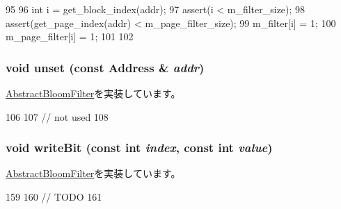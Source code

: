 \begin{DoxyCode}
95 {
96     int i = get_block_index(addr);
97     assert(i < m_filter_size);
98     assert(get_page_index(addr) < m_page_filter_size);
99     m_filter[i] = 1;
100     m_page_filter[i] = 1;
101 
102 }
\end{DoxyCode}
\hypertarget{classMultiGrainBloomFilter_a69b772787ea61467af679e3aa5406b41}{
\subsubsection[{unset}]{\setlength{\rightskip}{0pt plus 5cm}void unset (const {\bf Address} \& {\em addr})}}
\label{classMultiGrainBloomFilter_a69b772787ea61467af679e3aa5406b41}


\hyperlink{classAbstractBloomFilter_a0a35d1c7bad19fe9362068a0d319ec5f}{AbstractBloomFilter}を実装しています。


\begin{DoxyCode}
106 {
107     // not used
108 }
\end{DoxyCode}
\hypertarget{classMultiGrainBloomFilter_ac188318778d26b44f567c5b530598c16}{
\subsubsection[{writeBit}]{\setlength{\rightskip}{0pt plus 5cm}void writeBit (const int {\em index}, \/  const int {\em value})}}
\label{classMultiGrainBloomFilter_ac188318778d26b44f567c5b530598c16}


\hyperlink{classAbstractBloomFilter_a961813caf7bb3aece26914ac43c6293f}{AbstractBloomFilter}を実装しています。


\begin{DoxyCode}
159 {
160     // TODO
161 }
\end{DoxyCode}


